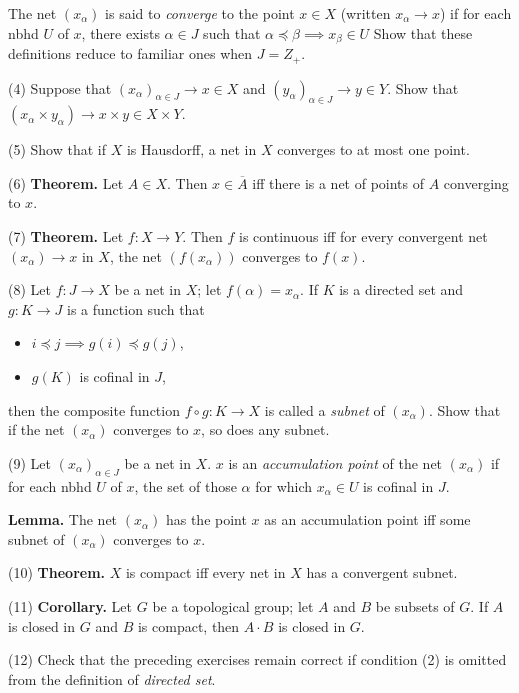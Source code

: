 \documentclass[a4paper]{article}
\begin{document}
The net $(x_\alpha)$ is said to \emph{converge} to the point $x \in X$ (written $x_\alpha \to x$) if for each nbhd $U$ of $x$, there exists $\alpha \in J$ such that $\alpha \preceq \beta \implies x_\beta \in U$ Show that these definitions reduce to familiar ones when $J = Z_+$.

(4) Suppose that $(x_\alpha)_{\alpha \in J} \to x \in X$ and $(y_\alpha)_{\alpha \in J} \to y \in Y$. Show that $(x_\alpha \times y_\alpha) \to x \times y \in X \times Y$.

(5) Show that if $X$ is Hausdorff, a net in $X$ converges to at most one point.

(6) \textbf{Theorem.} Let $A \in X$. Then $x \in \overline{A}$ iff there is a net of points of $A$ converging to $x$.

(7) \textbf{Theorem.} Let $f : X \to Y$. Then $f$ is continuous iff for every convergent net $(x_\alpha) \to x$ in $X$, the net $(f(x_\alpha))$ converges to $f(x)$.

(8) Let $f : J \to X$ be a net in $X$; let $f(\alpha) = x_\alpha$. If $K$ is a directed set and $g : K \to J$ is a function such that

\begin{itemize}
    \item $i \preceq j \implies g(i) \preceq g(j)$,
    \item $g(K)$ is cofinal in $J$,
\end{itemize}

then the composite function $f \circ g : K \to X$ is called a \emph{subnet} of $(x_\alpha)$. Show that if the net $(x_\alpha)$ converges to $x$, so does any subnet.

(9) Let $(x_\alpha)_{\alpha \in J}$ be a net in $X$. $x$ is an \emph{accumulation point} of the net $(x_\alpha)$ if for each nbhd $U$ of $x$, the set of those $\alpha$ for which $x_\alpha \in U$ is cofinal in $J$.

\textbf{Lemma.} The net $(x_\alpha)$ has the point $x$ as an accumulation point iff some subnet of $(x_\alpha)$ converges to $x$.

(10) \textbf{Theorem.} $X$ is compact iff every net in $X$ has a convergent subnet.

(11) \textbf{Corollary.} Let $G$ be a topological group; let $A$ and $B$ be subsets of $G$. If $A$ is closed in $G$ and $B$ is compact, then $A \cdot B$ is closed in $G$.

(12) Check that the preceding exercises remain correct if condition (2) is omitted from the definition of \emph{directed set}.
\end{document}
